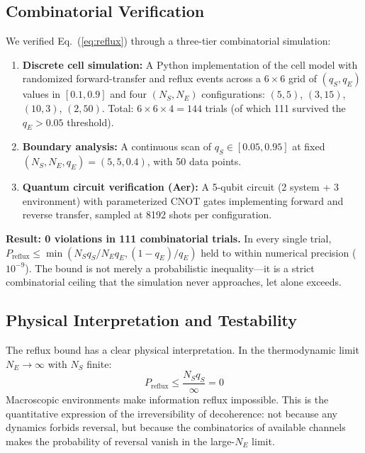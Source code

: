 \documentclass[12pt,a4paper]{article}
\theoremstyle{definition}
\theoremstyle{remark}
\begin{document}
\subsection{Combinatorial Verification}

We verified Eq.~(\ref{eq:reflux}) through a three-tier combinatorial simulation:

\begin{enumerate}[leftmargin=*,itemsep=0pt,topsep=0pt]
\item \textbf{Discrete cell simulation:} A Python implementation of the cell model with randomized forward-transfer and reflux events across a $6 \times 6$ grid of $(q_S, q_E)$ values in $[0.1, 0.9]$ and four $(N_S, N_E)$ configurations: $(5,5)$, $(3,15)$, $(10,3)$, $(2,50)$. Total: $6 \times 6 \times 4 = 144$ trials (of which 111 survived the $q_E > 0.05$ threshold).
\item \textbf{Boundary analysis:} A continuous scan of $q_S \in [0.05, 0.95]$ at fixed $(N_S, N_E, q_E) = (5, 5, 0.4)$, with 50 data points.
\item \textbf{Quantum circuit verification (Aer):} A 5-qubit circuit (2 system + 3 environment) with parameterized CNOT gates implementing forward and reverse transfer, sampled at 8192 shots per configuration.
\end{enumerate}

\textbf{Result: 0 violations in 111 combinatorial trials.} In every single trial, $P_{\mathrm{reflux}} \leq \min(N_S q_S/N_E q_E, (1-q_E)/q_E)$ held to within numerical precision ($10^{-9}$). The bound is not merely a probabilistic inequality---it is a strict combinatorial ceiling that the simulation never approaches, let alone exceeds.

\subsection{Physical Interpretation and Testability}

The reflux bound has a clear physical interpretation. In the thermodynamic limit $N_E \to \infty$ with $N_S$ finite:
\begin{equation}
P_{\mathrm{reflux}} \leq \frac{N_S q_S}{\infty} = 0
\end{equation}
Macroscopic environments make information reflux impossible. This is the quantitative expression of the irreversibility of decoherence: not because any dynamics forbids reversal, but because the combinatorics of available channels makes the probability of reversal vanish in the large-$N_E$ limit.
\end{document}
